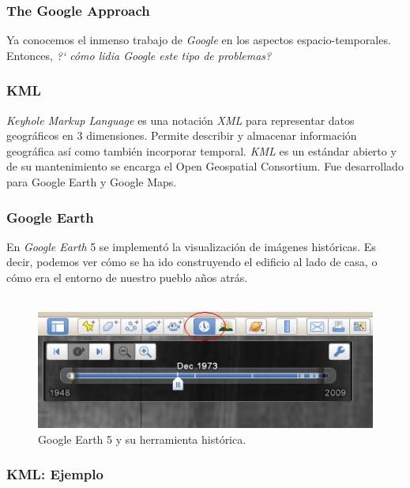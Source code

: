 \documentclass[a4paper,12pt,oneside]{report}
\begin{document}
\subsubsection*{The Google Approach}
Ya conocemos el inmenso trabajo de \textit{Google} en los aspectos espacio-temporales. Entonces, \textit{?` c\'omo lidia Google este tipo de problemas?}
\subsubsection*{KML}
\textit{Keyhole Markup Language} es una notaci\'on \textit{XML} para representar datos geogr\'aficos en 3 dimensiones. Permite describir y almacenar informaci\'on geogr\'afica as\'i como tambi\'en incorporar temporal. \textit{KML} es un est\'andar abierto y de su mantenimiento se encarga el Open Geospatial Consortium. Fue desarrollado para Google Earth y Google Maps.

\subsubsection*{Google Earth}
En \textit{Google Earth} 5 se implement\'o la visualizaci\'on de im\'agenes hist\'oricas. Es decir, podemos ver c\'omo se ha ido construyendo el edificio al lado de casa, o c\'omo era el entorno de nuestro pueblo a\~nos atr\'as.\\
\ \\
\begin{figure}[h]
\centering
\includegraphics[scale=0.6]{images/earth.jpg}
\caption{Google Earth 5 y su herramienta hist\'orica.}
\end{figure}
\subsubsection*{KML: Ejemplo}
\end{document}
